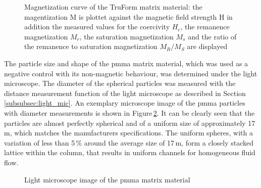 \begin{figure}[h]
\centering

\caption[Magnetization curve of the TruForm matrix material]{Magnetization curve of the TruForm matrix material: the magentization M is plottet against the magnetic field strength H in addition the measured values for the coercivity $H_{c}$, the remanence magnetization $M_{r}$, the saturation magnetization $M_{s}$ and the ratio of the remanence to saturation magnetization $M_{R}/M_{S}$ are displayed
\label{fig:Prax_hyst}
}
\end{figure}

The particle size and shape of the \gls{pmma} matrix material, which was used as a negative control with its non-magnetic behaviour, was determined under the light microscope. The diameter of the spherical particles was measured with the distance measurement function of the light microscope as described in Section\,\ref{subsubsec:light_mic}. An exemplary microscope image of the \gls{pmma} particles with diameter measurements is shown in Figure\,\ref{fig:PMMA}. It can be clearly seen that the particles are almost perfectly spherical and of a uniform size of approximately 17\,\textmu m, which matches the manufacturers specifications. The uniform spheres, with a variation of less than 5\,\% around the average size of 17\,\textmu m, form a closely stacked lattice within the column, that results in uniform channels for homogeneous fluid flow.

\begin{figure}[h]
\centering

\caption[Light microscope image of \gls{pmma}]{Light microscope image of the \gls{pmma} matrix material
\label{fig:PMMA}
}
\end{figure}

